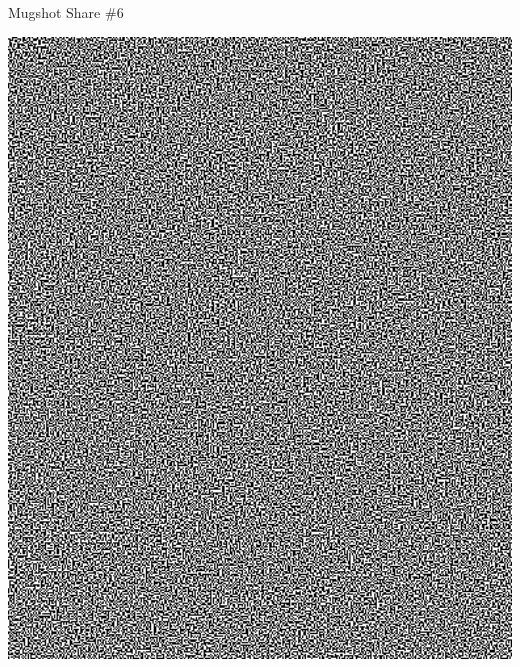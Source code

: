 \documentclass[a4paper]{article}
\begin{document}
\begin{center}
\Huge

Mugshot Share \#6


\vfill

\includegraphics[width=190mm]{Images/secret_share_5.png}

\end{center}
\end{document}
